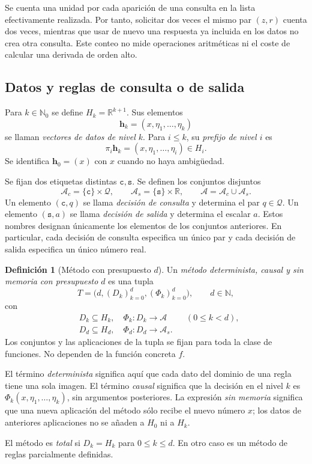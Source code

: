 \documentclass[11pt,a4paper]{article}
\numberwithin{equation}{section}
\theoremstyle{definition}
\newtheorem{definition}[theorem]{Definición}
\theoremstyle{remark}
\newcommand{\R}{\mathbb R}
\newcommand{\N}{\mathbb N}
\newcommand{\Nn}{\mathbb N_0}
\newcommand{\QQ}{\mathcal Q}
\newcommand{\hc}{\mathbf h}
\newcommand{\ct}{\mathtt c}
\newcommand{\st}{\mathtt s}
\begin{document}
Se cuenta una unidad por cada aparición de una consulta en la lista efectivamente realizada. Por tanto, solicitar dos veces el mismo par $(z,r)$ cuenta dos veces, mientras que usar de nuevo una respuesta ya incluida en los datos no crea otra consulta. Este conteo no mide operaciones aritméticas ni el coste de calcular una derivada de orden alto.

\subsection{Datos y reglas de consulta o de salida}
Para $k\in\Nn$ se define $H_k=\R^{k+1}$. Sus elementos
\[
\hc_k=(x,\eta_1,\ldots,\eta_k)
\]
se llaman \emph{vectores de datos de nivel $k$}. Para $i\le k$, su \emph{prefijo de nivel $i$} es
\[
\pi_i\hc_k=(x,\eta_1,\ldots,\eta_i)\in H_i.
\]
Se identifica $\hc_0=(x)$ con $x$ cuando no haya ambigüedad.

Se fijan dos etiquetas distintas $\ct,\st$. Se definen los conjuntos disjuntos
\[
\mathcal A_c=\{\ct\}\times\QQ,\qquad
\mathcal A_s=\{\st\}\times\R,\qquad
\mathcal A=\mathcal A_c\cup\mathcal A_s.
\]
Un elemento $(\ct,q)$ se llama \emph{decisión de consulta} y determina el par $q\in\QQ$. Un elemento $(\st,a)$ se llama \emph{decisión de salida} y determina el escalar $a$. Estos nombres designan únicamente los elementos de los conjuntos anteriores. En particular, cada decisión de consulta especifica un único par y cada decisión de salida especifica un único número real.

\begin{definition}[Método con presupuesto $d$]\label{def:method}
Un \emph{método determinista, causal y sin memoria con presupuesto $d$} es una tupla
\[
T=\bigl(d,(D_k)_{k=0}^{d},(\Phi_k)_{k=0}^{d}\bigr),\qquad d\in\N,
\]
con
\begin{align*}
&D_k\subseteq H_k,\quad \Phi_k:D_k\to\mathcal A &&(0\le k<d),\\
&D_d\subseteq H_d,\quad \Phi_d:D_d\to\mathcal A_s.&
\end{align*}
Los conjuntos y las aplicaciones de la tupla se fijan para toda la clase de funciones. No dependen de la función concreta $f$.

El término \emph{determinista} significa aquí que cada dato del dominio de una regla tiene una sola imagen. El término \emph{causal} significa que la decisión en el nivel $k$ es $\Phi_k(x,\eta_1,\ldots,\eta_k)$, sin argumentos posteriores. La expresión \emph{sin memoria} significa que una nueva aplicación del método sólo recibe el nuevo número $x$; los datos de anteriores aplicaciones no se añaden a $H_0$ ni a $H_k$.

El método es \emph{total} si $D_k=H_k$ para $0\le k\le d$. En otro caso es un método de reglas parcialmente definidas.
\end{definition}
\end{document}
